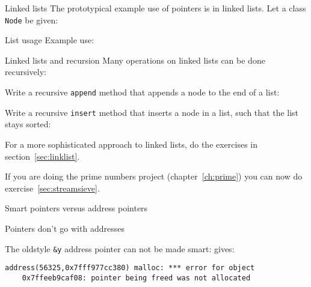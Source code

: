\begin{block}{Linked lists}
  \label{sl:linkedlistimpl}
  The prototypical example use of pointers is in linked lists. Let a
  class \lstinline{Node} be given:
  \begin{multicols}{2}
    \columnbreak
    \vfill\hbox{}
  \end{multicols}
\end{block}

\begin{block}{List usage}
\label{sl:linkedlistuse}
  Example use:
\end{block}

\begin{block}{Linked lists and recursion}
  \label{sl:linkedlistrecursive}
  Many operations on linked lists can be done recursively:
\end{block}

\begin{exercise}
  \label{ex:linkedlist1}
  Write a recursive \lstinline{append} method that appends a node to the end
  of a list:
\end{exercise}

\begin{exercise}
  \label{ex:linkedlist2}
  Write a recursive \lstinline{insert} method that inserts a node in a list, such that
  the list stays sorted:
\end{exercise}

\begin{exercise}
  \label{ex:linkedlist3}
  For a more sophisticated approach to linked lists, do the exercises
  in section~\ref{sec:linklist}.
\end{exercise}

\begin{exercise}
  If you are doing the prime numbers project (chapter~\ref{ch:prime})
  you can now do exercise~\ref{sec:streamsieve}.
\end{exercise}

 {Smart pointers versus address pointers}

\begin{block}{Pointers don't go with addresses}
  \label{sl:shareaddress}

  The oldstyle \lstinline{&y} address pointer can not be made smart:
  gives:
\begin{verbatim}
address(56325,0x7fff977cc380) malloc: *** error for object
    0x7ffeeb9caf08: pointer being freed was not allocated
\end{verbatim}
\end{block}

